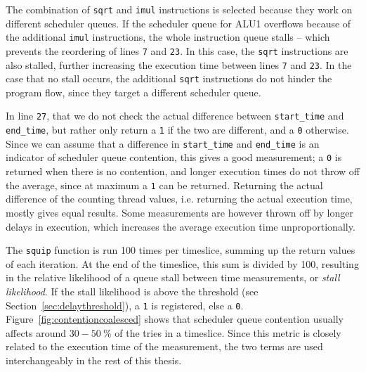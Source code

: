 \documentclass[11pt,
  titlepage=false,
  parskip=half,      %
]{scrreprt}
\begin{document}
The combination of \texttt{sqrt} and \texttt{imul} instructions is selected because they work on different scheduler queues.
If the scheduler queue for ALU1 overflows because of the additional \texttt{imul} instructions,
the whole instruction queue stalls -- which prevents the reordering of lines \texttt{7} and \texttt{23}.
In this case, the \texttt{sqrt} instructions are also stalled, further increasing the execution time between lines \texttt{7} and \texttt{23}.
In the case that no stall occurs, the additional \texttt{sqrt} instructions do not hinder the program flow,
since they target a different scheduler queue.

In line \texttt{27}, that we do not check the actual difference between \texttt{start\_time} and \texttt{end\_time},
but rather only return a \texttt{1} if the two are different, and a \texttt{0} otherwise.
Since we can assume that a difference in \texttt{start\_time} and \texttt{end\_time} is an indicator of scheduler queue contention,
this gives a good measurement;
a \texttt{0} is returned when there is no contention, and longer execution times do not throw off the average,
since at maximum a \texttt{1} can be returned.
Returning the actual difference of the counting thread values, i.e. returning the actual execution time, mostly gives equal results.
Some measurements are however thrown off by longer delays in execution,
which increases the average execution time unproportionally.

The \texttt{squip} function is run 100 times per timeslice, summing up the return values of each iteration.
At the end of the timeslice, this sum is divided by 100,
resulting in the relative likelihood of a queue stall between time measurements, or \textit{stall likelihood}.
If the stall likelihood is above the threshold (see Section~\ref{sec:delaythreshold}), a \texttt{1} is registered, else a \texttt{0}.
Figure~\ref{fig:contentioncoalesced} shows that scheduler queue contention usually affects around $30-50~\%$ of the tries in a timeslice.
Since this metric is closely related to the execution time of the measurement, the two terms are used interchangeably in the rest of this thesis.


\end{document}
